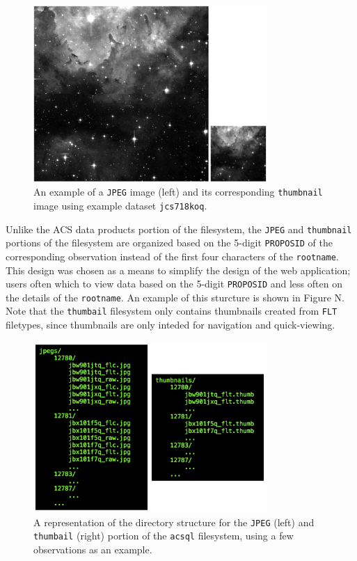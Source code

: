 \documentclass[10pt,journal,compsoc]{IEEEtran}
\begin{document}
\begin{figure}[!t]
\centering
\includegraphics[width=3.5in]{./figures/jpeg_and_thumbnail.png}
\caption{An example of a \texttt{JPEG} image (left) and its corresponding
\texttt{thumbnail} image using example dataset \texttt{jcs718koq}.}
\label{fig1}
\end{figure}

Unlike the ACS data products portion of the filesystem, the \texttt{JPEG}
and \texttt{thumbnail} portions of the filesystem are organized
based on the 5-digit \texttt{PROPOSID} of the corresponding observation
instead of the first four characters of the \texttt{rootname}.  This
design was chosen as a means to simplify the design of the web application;
users often which to view data based on the 5-digit \texttt{PROPOSID} and
less often on the details of the \texttt{rootname}.  An example of this
sturcture is shown in Figure N.  Note that the \texttt{thumbail} filesystem
only contains thumbnails created from \texttt{FLT} filetypes, since thumbnails
are only inteded for navigation and quick-viewing.

\begin{figure}[!t]
\centering
\includegraphics[width=3.5in]{./figures/jpeg_filesystem.png}
\caption{A representation of the directory structure for the \texttt{JPEG} (left)
and \texttt{thumbail} (right) portion of the \texttt{acsql} filesystem, using a
few observations as an example.}
\label{fig1}
\end{figure}
\end{document}
